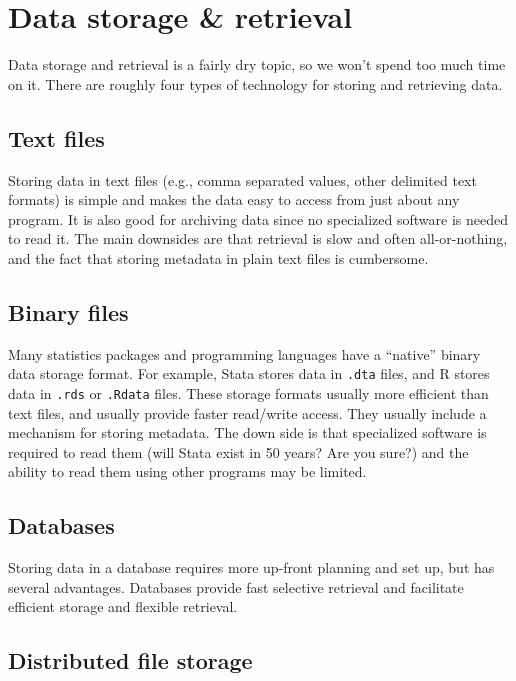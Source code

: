 \documentclass[]{book}
\begin{document}
\section{Data storage \& retrieval}\label{data-storage-retrieval}

Data storage and retrieval is a fairly dry topic, so we won't spend too
much time on it. There are roughly four types of technology for storing
and retrieving data.

\subsection{Text files}\label{text-files}

Storing data in text files (e.g., comma separated values, other
delimited text formats) is simple and makes the data easy to access from
just about any program. It is also good for archiving data since no
specialized software is needed to read it. The main downsides are that
retrieval is slow and often all-or-nothing, and the fact that storing
metadata in plain text files is cumbersome.

\subsection{Binary files}\label{binary-files}

Many statistics packages and programming languages have a ``native''
binary data storage format. For example, Stata stores data in
\texttt{.dta} files, and R stores data in \texttt{.rds} or
\texttt{.Rdata} files. These storage formats usually more efficient than
text files, and usually provide faster read/write access. They usually
include a mechanism for storing metadata. The down side is that
specialized software is required to read them (will Stata exist in 50
years? Are you sure?) and the ability to read them using other programs
may be limited.

\subsection{Databases}\label{databases}

Storing data in a database requires more up-front planning and set up,
but has several advantages. Databases provide fast selective retrieval
and facilitate efficient storage and flexible retrieval.

\subsection{Distributed file storage}\label{distributed-file-storage}
\end{document}

